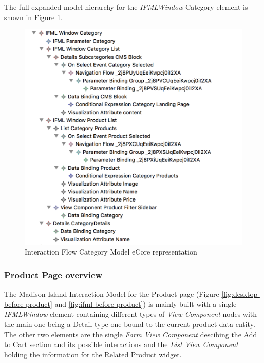 \newpage
The full expanded model hierarchy for the \textit{IFMLWindow} Category element is shown in Figure \ref{fig:ifml-before-hierarchy-category}.

\vspace{0.5cm}
\begin{figure}[H]
  \centering
    \includegraphics[width=13cm]{images/diagrams/before/ifml-hierarchy-category.png}
  \caption{Interaction Flow Category Model eCore representation}
  \label{fig:ifml-before-hierarchy-category}
\end{figure}
\vspace{0.5cm}


\subsubsection{Product Page overview}

The Madison Island Interaction Model for the Product page (Figure \ref{fig:desktop-before-product} and \ref{fig:ifml-before-product}) is mainly built with a single \textit{IFMLWindow} element containing different types of \textit{View Component} nodes with the main one being a Detail type one bound to the current product data entity. The other two elements are the single \textit{Form View Component} descibing the Add to Cart section and its possible interactions and the \textit{List View Component} holding the information for the Related Product widget.


